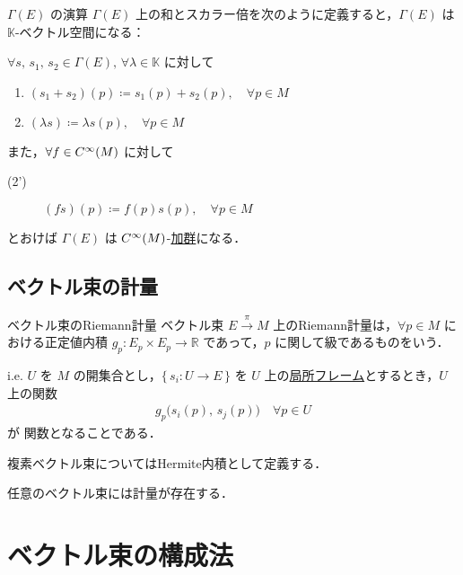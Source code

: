 \documentclass[geometry_main]{subfiles}
\begin{document}
\begin{mydef}[label=def.section_vec]{$\Gamma(E)$ の演算}
	$\Gamma(E)$ 上の和とスカラー倍を次のように定義すると，$\Gamma(E)$ は $\mathbb{K}$-ベクトル空間になる：
	
	$\forall s,\, s_1,\, s_2 \in \Gamma(E),\, \forall \lambda \in \mathbb{K}$ に対して
	\begin{enumerate}
		\item $(s_1 + s_2)(p) \coloneqq s_1(p) + s_2(p),\quad \forall p \in M$
		\item $(\lambda s) \coloneqq \lambda s(p),\quad \forall p \in M$
	\end{enumerate}
	\tcblower
	また，$\forall f \in C^\infty(M)$ に対して
	\begin{description}
		\item[\textrm{(2')}] $(f s)(p) \coloneqq f(p) s(p),\quad \forall p \in M$
	\end{description}
	とおけば $\Gamma(E)$ は $C^\infty(M)$-\hyperref[ax:module]{加群}になる．
\end{mydef}

\subsection{ベクトル束の計量}

\begin{mydef}[label=def.metric-fiber]{ベクトル束のRiemann計量}
	ベクトル束 $E \xrightarrow{\pi} M$ 上のRiemann計量は，$\forall p \in M$ における正定値内積 $g_p \colon E_p \times E_p \to \mathbb{R}$ であって，$p$ に関して\cinfty 級であるものをいう．
	
	i.e. $U$ を $M$ の開集合とし，$\{\, s_i \colon U \to E\, \}$ を $U$ 上の\hyperref[def.VB_frame]{局所フレーム}とするとき，$U$ 上の関数
	\begin{align}
		g_p \bigl( s_i(p),\, s_j(p) \bigr) \quad \forall p \in U
	\end{align}
	が \cinfty 関数となることである．

	複素ベクトル束についてはHermite内積として定義する．
\end{mydef}

\begin{myprop}[]{}
	任意のベクトル束には計量が存在する．
\end{myprop}

\section{ベクトル束の構成法}
\end{document}

